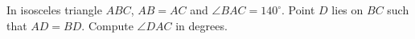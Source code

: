 In isosceles triangle $ABC$, $AB=AC$ and $\angle BAC=140^\circ$. Point $D$ lies on $BC$ such that $AD=BD$. Compute $\angle DAC$ in degrees.
